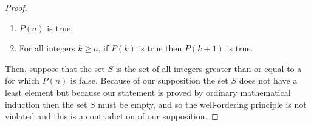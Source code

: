 \documentclass[12pt,letterpaper, onecolumn]{exam}
\begin{document}
\begin{questions}
\begin{solution}
\begin{proof}
		\begin{enumerate}
			\item $P(a)$ is true.
			\item For all integers $k\geq a$, if $P(k)$ is true then $P(k+1)$ is true.
		\end{enumerate}
		Then, suppose that the set $S$ is the set of all integers greater than or equal to a for which $P(n)$ is false. Because of our supposition the set $S$ does not have a least element but because our statement is proved by ordinary mathematical induction then the set $S$ must be empty, and so the well-ordering principle is not violated and this is a contradiction of our supposition.
		\end{proof}
	\end{solution}
	\end{questions}	
	
\end{document}
